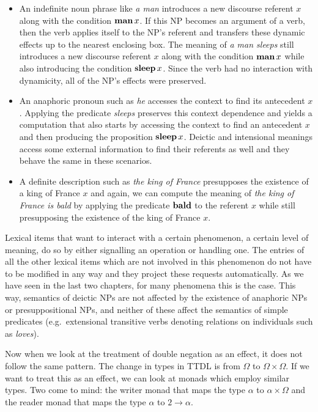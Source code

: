 \begin{itemize}
\item An indefinite noun phrase like \emph{a man} introduces a new
  discourse referent $x$ along with the condition $\textbf{man}\,x$. If this
  NP becomes an argument of a verb, then the verb applies itself to the
  NP's referent and transfers these dynamic effects up to the nearest
  enclosing box. The meaning of \emph{a man sleeps} still introduces a new
  discourse referent $x$ along with the condition $\textbf{man}\,x$ while also
  introducing the condition $\textbf{sleep}\,x$. Since the verb had no
  interaction with dynamicity, all of the NP's effects were preserved.
\item An anaphoric pronoun such as \emph{he} accesses the context to find
  its antecedent $x$. Applying the predicate \emph{sleeps} preserves this
  context dependence and yields a computation that also starts by accessing
  the context to find an antecedent $x$ and then producing the proposition
  $\textbf{sleep}\,x$. Deictic and intensional meanings access some external
  information to find their referents as well and they behave the same in
  these scenarios.
\item A definite description such as \emph{the king of France} presupposes
  the existence of a king of France $x$ and again, we can compute the
  meaning of \emph{the king of France is bald} by applying the predicate
  $\textbf{bald}$ to the referent $x$ while still presupposing the existence
  of the king of France $x$.
\end{itemize}

Lexical items that want to interact with a certain phenomenon, a certain
level of meaning, do so by either signalling an operation or handling
one. The entries of all the other lexical items which are not involved in
this phenomenon do not have to be modified in any way and they project
these requests automatically. As we have seen in the last two chapters, for
many phenomena this is the case. This way, semantics of deictic NPs are not
affected by the existence of anaphoric NPs or presuppositional NPs, and
neither of these affect the semantics of simple predicates (e.g.\
extensional transitive verbs denoting relations on individuals such as
\emph{loves}).

Now when we look at the treatment of double negation as an effect, it does
not follow the same pattern. The change in types in TTDL is from $\Omega$
to $\Omega \times \Omega$. If we want to treat this as an effect, we can
look at monads which employ similar types. Two come to mind: the writer
monad that maps the type $\alpha$ to $\alpha \times \Omega$ and the reader
monad that maps the type $\alpha$ to $2 \to \alpha$.


